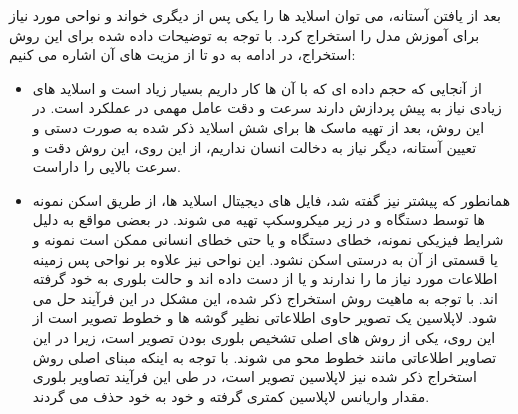 بعد از یافتن آستانه، می توان اسلاید ها را یکی پس از دیگری خواند و نواحی مورد نیاز برای آموزش مدل را استخراج کرد.
با توجه به توضیحات داده شده برای این روش استخراج، در ادامه به دو تا از مزیت های آن اشاره می کنیم:
\begin{itemize}
    \item از آنجایی که حجم داده ای که با آن ها کار داریم بسیار زیاد است و اسلاید های زیادی نیاز به پیش پردازش دارند سرعت و دقت عامل مهمی در عملکرد است.
    در این روش، بعد از تهیه ماسک ها برای شش اسلاید ذکر شده به صورت دستی و تعیین آستانه، دیگر نیاز به دخالت انسان نداریم، از این روی، این روش دقت و سرعت بالایی را داراست.
    \item همانطور که پیشتر نیز گفته شد، فایل های دیجیتال اسلاید ها، از طریق اسکن نمونه ها توسط دستگاه و در زیر میکروسکپ تهیه می شوند.
    در بعضی مواقع به دلیل شرایط فیزیکی نمونه، خطای دستگاه و یا حتی خطای انسانی ممکن است نمونه و یا قسمتی از آن به درستی اسکن نشود.
    این نواحی نیز علاوه بر نواحی پس زمینه اطلاعات مورد نیاز ما را ندارند و یا از دست داده اند و حالت بلوری به خود گرفته اند.
    با توجه به ماهیت روش استخراج ذکر شده، این مشکل در این فرآیند حل می شود.
    لاپلاسین یک تصویر حاوی اطلاعاتی نظیر گوشه ها و خطوط تصویر است از این روی، یکی از روش های اصلی تشخیص بلوری بودن تصویر است، زیرا در این تصاویر اطلاعاتی مانند خطوط محو می شوند.
    با توجه به اینکه مبنای اصلی روش استخراج ذکر شده نیز لاپلاسین تصویر است، در طی این فرآیند تصاویر بلوری مقدار واریانس لاپلاسین کمتری گرفته و خود به خود حذف می گردند.
\end{itemize}
